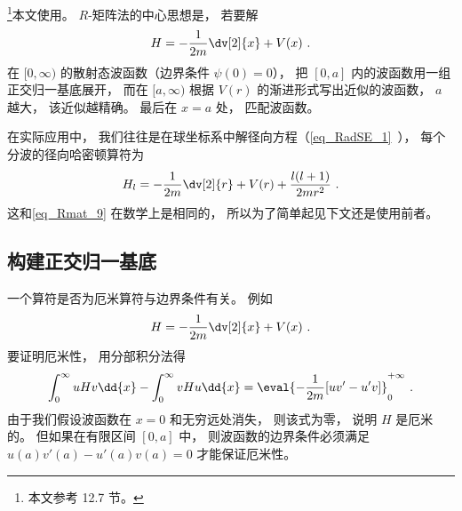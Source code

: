 

\footnote{本文参考 \cite{Bransden} 12.7 节。}本文使用。 $R$-矩阵法的中心思想是， 若要解
\begin{equation}\label{eq_Rmat_9}
H = -\frac{1}{2m}\dv[2]{x} + V(x)~.
\end{equation}
在 $[0, \infty)$ 的散射态波函数（边界条件 $\psi(0) = 0$）， 把 $[0,a]$ 内的波函数用一组正交归一基底展开， 而在 $[a,\infty)$ 根据 $V(r)$ 的渐进形式写出近似的波函数， $a$ 越大， 该近似越精确。 最后在 $x=a$ 处， 匹配波函数。

在实际应用中， 我们往往是在球坐标系中解径向方程（\autoref{eq_RadSE_1}~）， 每个分波的径向哈密顿算符为
\begin{equation}
H_l = -\frac{1}{2m} \dv[2]{r} + V(r) + \frac{l(l + 1)}{2mr^2}~.
\end{equation}
这和\autoref{eq_Rmat_9} 在数学上是相同的， 所以为了简单起见下文还是使用前者。

\subsection{构建正交归一基底}
一个算符是否为厄米算符与边界条件有关。 例如
\begin{equation}
H = -\frac{1}{2m}\dv[2]{x} + V(x)~.
\end{equation}
要证明厄米性， 用分部积分法得
\begin{equation}\label{eq_Rmat_1}
\int_{0}^{\infty} uHv\dd{x} - \int_{0}^{\infty} vHu\dd{x}
= \eval{-\frac{1}{2m}[uv' - u'v]}_{0}^{+\infty}~.
\end{equation}
由于我们假设波函数在 $x=0$ 和无穷远处消失， 则该式为零， 说明 $H$ 是厄米的。 但如果在有限区间 $[0, a]$ 中， 则波函数的边界条件必须满足 $u(a)v'(a) - u'(a)v(a) = 0$ 才能保证厄米性。

